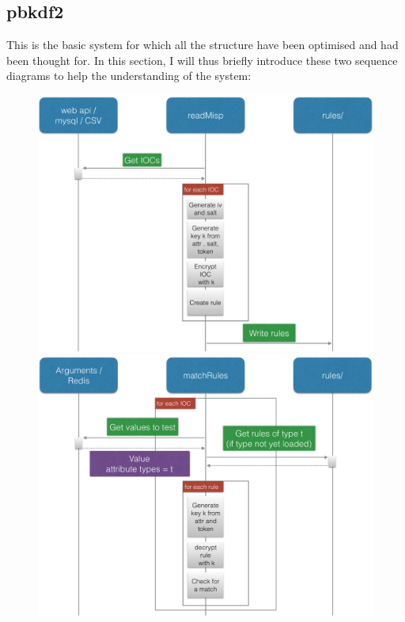 \documentclass{eplmastersthesis}
\begin{document}
\subsection{\gls{pbkdf2}}
This is the basic system for which all the structure have been optimised and had been thought for. In this section, I will thus briefly introduce these two sequence diagrams to help the understanding of the system:
\begin{figure}[h!]
\begin{center}
   \begin{minipage}[c]{.46\linewidth}
      \includegraphics[scale=0.24]{res/seqDiagramRead}
   \end{minipage} \hfill
   \begin{minipage}[c]{.46\linewidth}
      \includegraphics[scale=0.24]{res/seqDiagramMatch}
   \end{minipage}
\end{center}
\end{figure}
\end{document}

